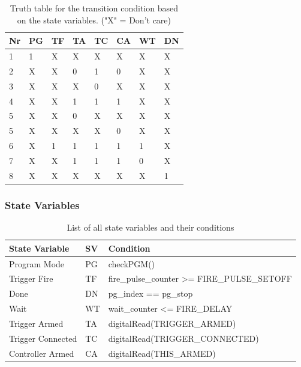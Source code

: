 \begin{table}[!ht]
\centering
\begin{tabular}{|l|l|l|l|l|l|l|l|} 
\hline
Nr & PG & TF & TA & TC & CA & WT & DN  \\ 
\hline \hline
1  & 1  & X  & X  & X  & X  & X  & X   \\ 
\hline
2  & X  & X  & 0  & 1  & 0  & X  & X   \\ 
\hline
3  & X  & X  & X  & 0  & X  & X  & X   \\ 
\hline
4  & X  & X  & 1  & 1  & 1  & X  & X   \\ 
\hline
5  & X  & X  & 0  & X  & X  & X  & X   \\ 
\hline
5  & X  & X  & X  & X  & 0  & X  & X   \\ 
\hline
6  & X  & 1  & 1  & 1  & 1  & 1  & X   \\ 
\hline
7  & X  & X  & 1  & 1  & 1  & 0  & X   \\ 
\hline
8  & X  & X  & X  & X  & X  & X  & 1   \\
\hline
\end{tabular}
\caption{Truth table for the transition condition based on the state variables. ("X" = Don't care)}
\label{lst:transcond}
\end{table}

\subsubsection{State Variables}
\label{State Variables}

\begin{table}[!ht]
\centering
\begin{tabular}{|l|l|l|} 
\hline
State Variable    & SV & Condition                                   \\ 
\hline \hline
Program Mode      & PG & checkPGM()                                  \\ 
\hline
Trigger Fire      & TF & fire\_pulse\_counter >= FIRE\_PULSE\_SETOFF  \\ 
\hline
Done              & DN & pg\_index == pg\_stop                       \\ 
\hline
Wait              & WT & wait\_counter <= FIRE\_DELAY                 \\ 
\hline
Trigger Armed     & TA & digitalRead(TRIGGER\_ARMED)                 \\ 
\hline
Trigger Connected & TC & digitalRead(TRIGGER\_CONNECTED)             \\ 
\hline
Controller Armed  & CA & digitalRead(THIS\_ARMED)                    \\
\hline
\end{tabular}	
\caption{List of all state variables and their conditions}
\label{tab:state_vars_list}
\end{table}


